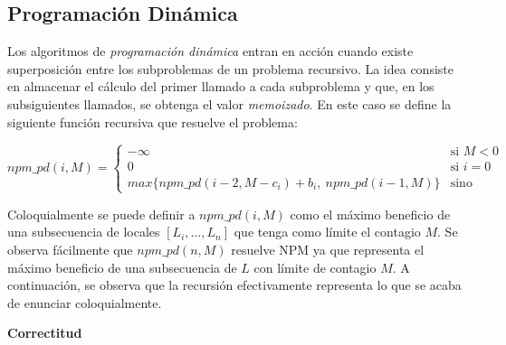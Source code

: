 \subsection{Programación Dinámica}

Los algoritmos de \textit{programación dinámica} entran en acción cuando existe superposición entre los subproblemas de un problema recursivo. La idea consiste en almacenar el cálculo del primer llamado a cada subproblema y que, en los subsiguientes llamados, se obtenga el valor \textit{memoizado}. En este caso se define la siguiente función recursiva que resuelve el problema:

\begin{equation}
    npm\_pd(i, M) = 
        \begin{cases}
            -\infty & \text{si } M < 0 \\
            0 & \text{si } i = 0 \\
            max \{npm\_pd(i-2, M - c_i) + b_i,\ npm\_pd(i-1,M) \} & \text{sino}
        \end{cases}
    \label{eq:npm_pd}
\end{equation}

Coloquialmente se puede definir a $npm\_pd(i, M)$ como el máximo beneficio de una subsecuencia de locales $[L_i,\dots,L_n]$ que tenga como límite el contagio $M$. Se observa fácilmente que $npm\_pd(n, M)$ resuelve NPM ya que representa el máximo beneficio de una subsecuencia de $L$ con límite de contagio $M$. A continuación, se observa que la recursión efectivamente representa lo que se acaba de enunciar coloquialmente.

\textbf{Correctitud}


